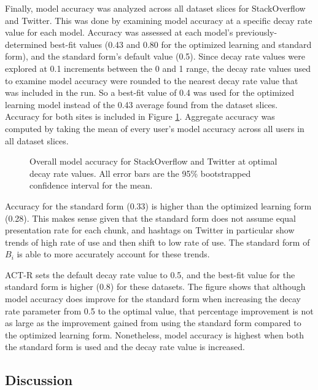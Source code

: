 \documentclass[man,floatsintext,donotrepeattitle]{apa6}
\newcommand{\numNoZero}[1]{{\sisetup{add-integer-zero=false}\num{#1}}}
\begin{document}
\FloatBarrier

Finally, model accuracy was analyzed across all dataset slices for StackOverflow and Twitter.
This was done by examining model accuracy at a specific decay rate value for each model.
Accuracy was assessed at each model's previously-determined best-fit values (\num{.43} and \num{.80} for the optimized learning and standard form), and the standard form's default value (\num{0.5}).
Since decay rate values were explored at \num{0.1} increments between the 0 and 1 range, the decay rate values used to examine model accuracy were rounded to the nearest decay rate value that was included in the run.
So a best-fit value of \num{.4} was used for the optimized learning model instead of the \num{.43} average found from the dataset slices.
Accuracy for both sites is included in Figure \ref{figPriorAcc}. 
Aggregate accuracy was computed by taking the mean of every user's model accuracy across all users in all dataset slices.

\begin{figure}[!htbp]
  \caption{
    Overall model accuracy for StackOverflow and Twitter at optimal decay rate values.
    All error bars are the 95\% bootstrapped confidence interval for the mean. 
  }
  \label{figPriorAcc}
\end{figure}

Accuracy for the standard form (\numNoZero{.33}) is higher than the optimized learning form (\numNoZero{.28}).
This makes sense given that the standard form does not assume equal presentation rate for each chunk, and hashtags on Twitter in particular show trends of high rate of use and then shift to low rate of use. 
The standard form of $B_{i}$ is able to more accurately account for these trends.

ACT-R sets the default decay rate value to \num{0.5}, and the best-fit value for the standard form is higher (\num{0.8}) for these datasets.
The figure shows that although model accuracy does improve for the standard form when increasing the decay rate parameter from \num{0.5} to the optimal value,
that percentage improvement is not as large as the improvement gained from using the standard form compared to the optimized learning form.
Nonetheless, model accuracy is highest when both the standard form is used and the decay rate value is increased. 

\subsection{Discussion}
\end{document}
